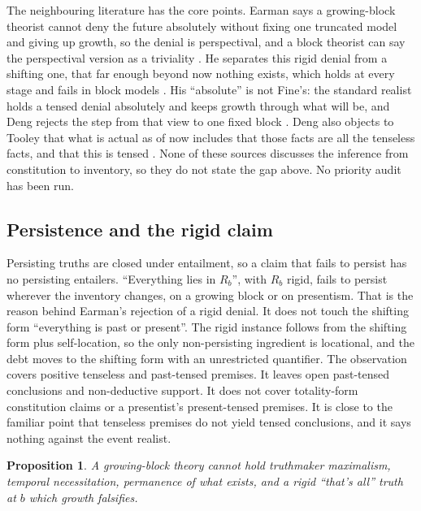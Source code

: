 \documentclass[11pt]{article}
\newtheorem{proposition}[theorem]{Proposition}
\theoremstyle{definition}
\begin{document}
The neighbouring literature has the core points. Earman says a growing-block theorist cannot deny the future absolutely
without fixing one truncated model and giving up growth, so the denial is perspectival, and a block theorist can
say the perspectival version as a triviality \citep[pp.~144--145]{Earman2008}. He separates this rigid denial from a
shifting one, that far enough beyond now nothing exists, which holds at every stage and fails in block models
\citep[pp.~144, 159]{Earman2008}. His ``absolute'' is not Fine's: the standard realist holds a tensed denial absolutely
and keeps growth through what will be, and Deng rejects the step from that view to one fixed block
\citep[\S4]{Deng2017}. Deng also objects to Tooley that what is actual as of now includes that those facts are all the
tenseless facts, and that this is tensed \citep[\S6]{Deng2017}. None of these sources discusses the inference from
constitution to inventory, so they do not state the gap above. No priority audit has been run.

\subsection{Persistence and the rigid claim}

Persisting truths are closed under entailment, so a claim that fails to persist has no persisting entailers.
``Everything lies in $R_b$'', with $R_b$ rigid, fails to persist wherever the inventory changes, on a growing block or on
presentism. That is the reason behind Earman's rejection of a rigid denial. It does not touch the shifting form
``everything is past or present''. The rigid instance follows from the shifting form plus self-location, so the only
non-persisting ingredient is locational, and the debt moves to the shifting form with an unrestricted quantifier. The
observation covers positive tenseless and past-tensed premises. It leaves open past-tensed conclusions and non-deductive
support. It does not cover totality-form constitution claims or a presentist's present-tensed premises. It is close to the familiar point that tenseless premises do not yield tensed conclusions, and it says
nothing against the event realist.

\begin{proposition}\label{prop:tetrad}
A growing-block theory cannot hold truthmaker maximalism, temporal necessitation, permanence of what exists, and a rigid
``that's all'' truth at $b$ which growth falsifies.
\end{proposition}
\end{document}
